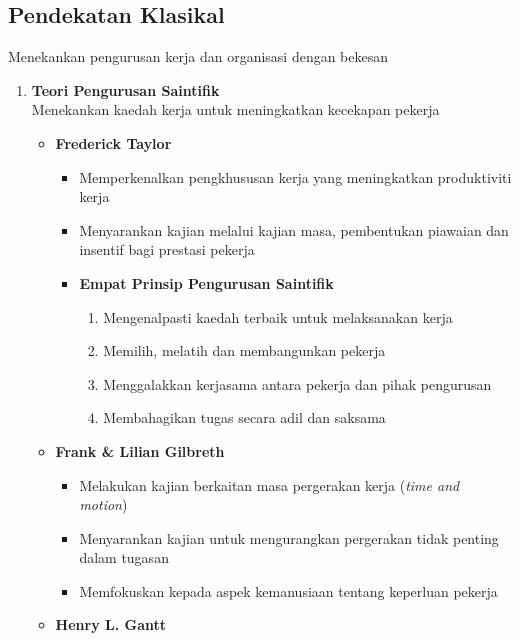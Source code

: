 \documentclass{book}
\begin{document}
\begin{multicols*}{2}
    \subsection*{Pendekatan Klasikal}
    Menekankan pengurusan kerja dan organisasi dengan bekesan
    \vfill\null\columnbreak
    \begin{enumerate}
      \item \textbf{Teori Pengurusan Saintifik} \\
        Menekankan kaedah kerja untuk meningkatkan kecekapan pekerja  
        \begin{itemize}[leftmargin=*]
          \item \textbf{Frederick Taylor}
            \begin{itemize}[leftmargin=*]
              \item Memperkenalkan pengkhususan kerja yang meningkatkan produktiviti kerja
              \item Menyarankan kajian melalui kajian  masa, pembentukan piawaian dan 
                insentif bagi prestasi pekerja
              \item \textbf{Empat Prinsip Pengurusan Saintifik}
                \begin{enumerate}[label=\roman*.]
                  \item Mengenalpasti kaedah terbaik untuk melaksanakan kerja
                  \item Memilih, melatih dan membangunkan pekerja 
                  \item Menggalakkan kerjasama antara pekerja dan pihak pengurusan
                  \item Membahagikan tugas secara adil dan saksama
                \end{enumerate}
            \end{itemize}
          \item \textbf{Frank \& Lilian Gilbreth}
            \begin{itemize}[leftmargin=*]
              \item Melakukan kajian berkaitan masa pergerakan kerja (\textit{time and motion})
              \item Menyarankan kajian untuk mengurangkan pergerakan tidak penting dalam tugasan
              \item Memfokuskan kepada aspek kemanusiaan tentang keperluan pekerja
            \end{itemize}
          \item \textbf{Henry L. Gantt}

\end{itemize}
\end{enumerate}
\end{multicols*}
\end{document}
